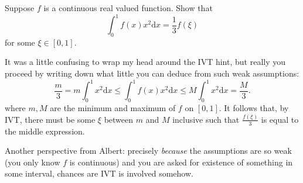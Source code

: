 \begin{problem}
	Suppose $f$ is a continuous real valued function. Show that
	\[
		\int_0^1 f(x)x^2 \mathrm{d}x = \frac{1}{3} f(\xi)
	\]
	for some $\xi \in [0,1]$.
\end{problem}
\begin{solution}
	It was a little confusing to wrap my head around the IVT hint, but really you proceed by writing down what little you can deduce from such weak assumptions:
	\[
		\frac{m}{3} = m \int_0^1 x^2 \mathrm{d} x \leq \int_0^1 f(x) x^2 \mathrm{d} x \leq M \int_0^1 x^2 \mathrm{d}x = \frac{M}{3}.
	\]
	where $m,M$ are the minimum and maximum of $f$ on $[0,1]$. It follows that, by IVT, there must be some $\xi$ between $m$ and $M$ inclusive such that $\frac{f(\xi)}{3}$ is equal to the middle expression.
	
	Another perspective from Albert: precisely \emph{because} the assumptions are so weak (you only know $f$ is continuous) and you are asked for existence of something in some interval, chances are IVT is involved somehow.
\end{solution}


